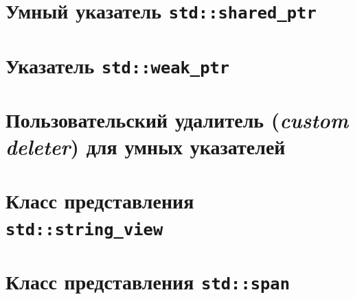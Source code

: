 \documentclass{article}
\begin{document}
\newpage
\section*{Умный указатель \texttt{std::shared\_ptr}}

\newpage
\section*{Указатель \texttt{std::weak\_ptr}}

\section*{Пользовательский удалитель (\textit{custom deleter}) для умных указателей}

\section*{Класс представления \texttt{std::string\_view}}

\section*{Класс представления \texttt{std::span}}
\end{document}
